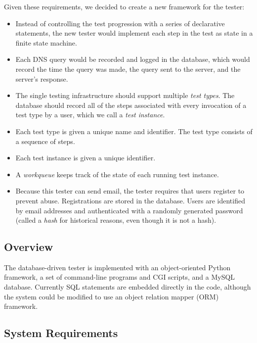 \documentclass[preprint,3p,11pt]{elsarticle}
\begin{document}
\noindent Given these requirements, we decided to create a new framework for the
tester:

\begin{itemize}
\item Instead of controlling the test progression with a series of
  declarative statements, the new tester would implement each
  step in the test as state in a finite state machine. 
\item Each DNS query would be recorded and logged in the database,
  which would record the time the query was made, the query sent to
  the server, and the server's response. 
\item The single testing infrastructure should support multiple \emph{test
  types}. The database should record all of the steps associated with
  every invocation of a test type by a user, which we call a
  \emph{test instance}.
\item Each test type is given a unique name and identifier. The test type
  consists of a sequence of steps.
\item Each test instance is given a unique identifier. 
\item A \emph{workqueue} keeps track of the state of each running test instance.
\item Because this tester can send email, the tester requires that
  users register to prevent abuse. Registrations are stored in the
  database. Users are identified by email addresses and authenticated
  with a randomly generated password (called a \emph{hash} for
  historical reasons, even though it is not a hash). 
\end{itemize}

\subsection{Overview}
The database-driven tester is implemented with an object-oriented
Python framework, a set of command-line programs and CGI scripts, and
a MySQL database. Currently SQL statements are embedded directly in
the code, although the system could be modified to use an object
relation mapper (ORM) framework. 

\subsection{System Requirements}
\end{document}

